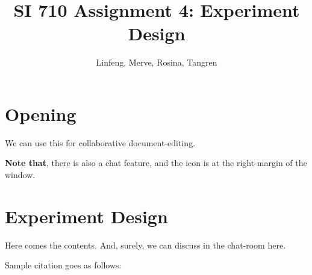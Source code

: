 \documentclass{article}
\title{SI 710 Assignment 4: Experiment Design}
\author{Linfeng, Merve, Rosina, Tangren}
\date{}
\begin{document}
\maketitle

\section{Opening}%

We can use this for collaborative document-editing.

\textbf{Note that}, there is also a chat feature, and the icon is at the right-margin of the window.

\section{Experiment Design}

Here comes the contents. And, surely, we can discuss in the chat-room here.

Sample citation goes as follows: \cite{adams1995hitchhiker}





\end{document}
